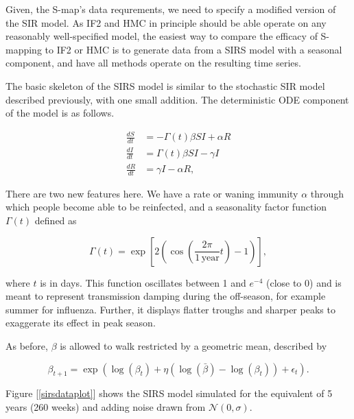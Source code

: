 	Given, the S-map's data requrements, we need to specify a modified version of the SIR model. As IF2 and HMC in principle should be able operate on any reasonably well-specified model, the easiest way to compare the efficacy of S-mapping to IF2 or HMC is to generate data from a SIRS model with a seasonal component, and have all methods operate on the resulting time series.

	The basic skeleton of the SIRS model is similar to the stochastic SIR model described previously, with one small addition. The deterministic ODE component of the model is as follows.

	\begin{equation}
		\begin{aligned}
			\frac{dS}{dt} & = - \Gamma(t) \beta S I + \alpha R \\
			\frac{dI}{dt} & = \Gamma(t) \beta S I - \gamma I \\
			\frac{dR}{dt} & = \gamma I - \alpha R,
		\end{aligned}
	\end{equation}

	There are two new features here. We have a rate or waning immunity $\alpha$ through which people become able to be reinfected, and a seasonality factor function $\Gamma (t)$ defined as

	\begin{equation}
		\Gamma(t) = \exp \left[ 2 \left( \cos \left(  \frac{2 \pi}{1 \, \text{year}} t \right) - 1 \right) \right],
	\end{equation}

	where $t$ is in days. This function oscillates between 1 and $e^{-4}$ (close to 0) and is meant to represent transmission damping during the off-season, for example summer for influenza. Further, it displays flatter troughs and sharper peaks to exaggerate its effect in peak season.

	As before, $\beta$ is allowed to walk restricted by a geometric mean, described by

	\begin{equation}
		\beta_{t+1} = \exp \left( \log(\beta_{t}) + \eta (\log(\bar{\beta}) - \log(\beta_{t})) + \epsilon_{t} \right).
	\end{equation}

	Figure [\ref{sirsdataplot}] shows the SIRS model simulated for the equivalent of 5 years (260 weeks) and adding noise drawn from $\mathcal{N}(0,\sigma)$.

